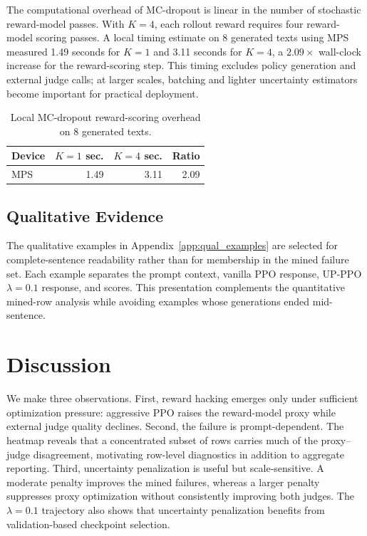 \documentclass[twocolumn,10pt]{article}
\begin{document}
The computational overhead of MC-dropout is linear in the number of stochastic reward-model passes. With $K=4$, each rollout reward requires four reward-model scoring passes. A local timing estimate on 8 generated texts using MPS measured 1.49 seconds for $K=1$ and 3.11 seconds for $K=4$, a $2.09\times$ wall-clock increase for the reward-scoring step. This timing excludes policy generation and external judge calls; at larger scales, batching and lighter uncertainty estimators become important for practical deployment.

\begin{table}[!tbp]
\centering
\scriptsize
\caption{Local MC-dropout reward-scoring overhead on 8 generated texts.}
\label{tab:mc_overhead}
\begin{tabular}{lrrr}
\toprule
Device & $K=1$ sec. & $K=4$ sec. & Ratio \\
\midrule
MPS & 1.49 & 3.11 & 2.09 \\
\bottomrule
\end{tabular}
\end{table}

\subsection{Qualitative Evidence}
The qualitative examples in Appendix~\ref{app:qual_examples} are selected for complete-sentence readability rather than for membership in the mined failure set. Each example separates the prompt context, vanilla PPO response, UP-PPO $\lambda=0.1$ response, and scores. This presentation complements the quantitative mined-row analysis while avoiding examples whose generations ended mid-sentence.


\section{Discussion}
We make three observations. First, reward hacking emerges only under sufficient optimization pressure: aggressive PPO raises the reward-model proxy while external judge quality declines. Second, the failure is prompt-dependent. The heatmap reveals that a concentrated subset of rows carries much of the proxy--judge disagreement, motivating row-level diagnostics in addition to aggregate reporting. Third, uncertainty penalization is useful but scale-sensitive. A moderate penalty improves the mined failures, whereas a larger penalty suppresses proxy optimization without consistently improving both judges. The $\lambda=0.1$ trajectory also shows that uncertainty penalization benefits from validation-based checkpoint selection.
\end{document}
